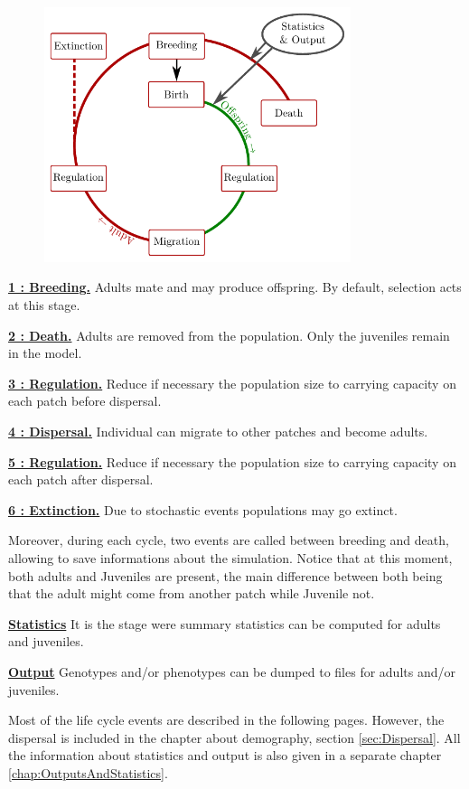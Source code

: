 \documentclass[letterpaper,12pt,oneside]{book}
\begin{document}
\begin{figure}[h]
    \centering
        \includegraphics[width=0.80\textwidth]{life_cycle.pdf}
    \label{fig:life-cycle}
\end{figure}
\begin{description}
\item \textbf{\hyperref[sec:MatingSystem]{1 : Breeding.}} Adults mate and may produce offspring. By default, selection acts at this stage.
\item \textbf{\hyperref[sec:Death]{2 : Death.}} Adults are removed from the population. Only the juveniles remain in the model.
\item \textbf{\hyperref[sec:RegulationOffspring]{3 : Regulation.}} Reduce if necessary the population size to carrying capacity on each patch before dispersal. 
\item \textbf{\hyperref[sec:Dispersal]{4 : Dispersal.}} Individual can migrate to other patches and become adults. 
\item \textbf{\hyperref[sec:RegulationAdults]{5 : Regulation.}} Reduce if necessary the population size to carrying capacity on each patch after dispersal. 
\item \textbf{\hyperref[sec:Extinction]{6 : Extinction.}} Due to stochastic events populations may go extinct.
\end{description}
Moreover, during each cycle,  two events are called between breeding and death, allowing to save informations about the simulation.  Notice that at this moment, both adults and Juveniles are present, the main difference between both being that the adult might come from another patch while Juvenile not. 
\begin{description}
\item \textbf{\hyperref[sec:SummaryStatistics]{Statistics}} It is the stage were summary statistics can be computed for adults and juveniles.
\item \textbf{\hyperref[sec:RawData]{Output}} Genotypes and/or phenotypes can be dumped to files for adults and/or juveniles.
\end{description}
Most of the life cycle events are described in the following pages. However, the dispersal is included in the chapter about demography,  section \ref{sec:Dispersal}. All the information about statistics and output is also given in a separate chapter \ref{chap:OutputsAndStatistics}.
\end{document}
